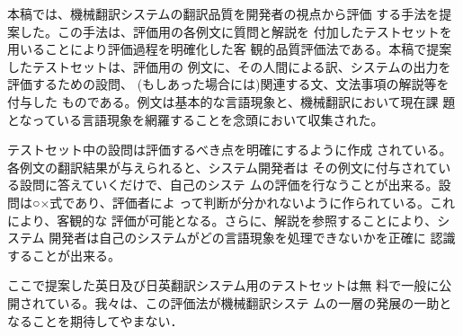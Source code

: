 本稿では、機械翻訳システムの翻訳品質を開発者の視点から評価
する手法を提案した。この手法は、評価用の各例文に質問と解説を
付加したテストセットを用いることにより評価過程を明確化した客
観的品質評価法である。本稿で提案したテストセットは、評価用の
例文に、その人間による訳、システムの出力を評価するための設問、
(もしあった場合には)関連する文、文法事項の解説等を付与した
ものである。例文は基本的な言語現象と、機械翻訳において現在課
題となっている言語現象を網羅することを念頭において収集された。

テストセット中の設問は評価するべき点を明確にするように作成
されている。各例文の翻訳結果が与えられると、システム開発者は
その例文に付与されている設問に答えていくだけで、自己のシステ
ムの評価を行なうことが出来る。設問は○×式であり、評価者によ
って判断が分かれないように作られている。これにより、客観的な
評価が可能となる。さらに、解説を参照することにより、システム
開発者は自己のシステムがどの言語現象を処理できないかを正確に
認識することが出来る。

ここで提案した英日及び日英翻訳システム用のテストセットは無
料で一般に公開されている。我々は、この評価法が機械翻訳システ
ムの一層の発展の一助となることを期待してやまない．\\


\clearpage

